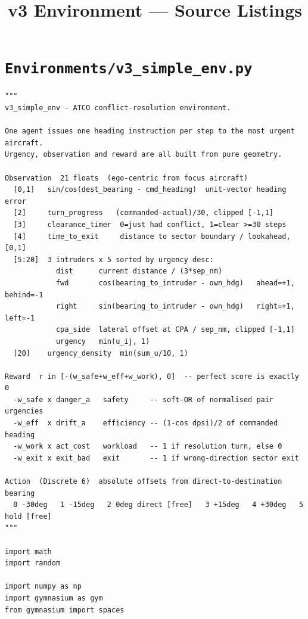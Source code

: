 \documentclass[10pt, a4paper]{article}
\title{\textbf{v3 Environment --- Source Listings}}
\author{}
\date{}
\begin{document}
\maketitle
\tableofcontents
\newpage

\section{\texttt{Environments/v3\_simple\_env.py}}

\begin{lstlisting}[caption={v3\_simple\_env.py --- ATCO conflict-resolution environment}, label=lst:env]
"""
v3_simple_env - ATCO conflict-resolution environment.

One agent issues one heading instruction per step to the most urgent aircraft.
Urgency, observation and reward are all built from pure geometry.

Observation  21 floats  (ego-centric from focus aircraft)
  [0,1]   sin/cos(dest_bearing - cmd_heading)  unit-vector heading error
  [2]     turn_progress   (commanded-actual)/30, clipped [-1,1]
  [3]     clearance_timer  0=just had conflict, 1=clear >=30 steps
  [4]     time_to_exit     distance to sector boundary / lookahead, [0,1]
  [5:20]  3 intruders x 5 sorted by urgency desc:
            dist      current distance / (3*sep_nm)
            fwd       cos(bearing_to_intruder - own_hdg)   ahead=+1, behind=-1
            right     sin(bearing_to_intruder - own_hdg)   right=+1, left=-1
            cpa_side  lateral offset at CPA / sep_nm, clipped [-1,1]
            urgency   min(u_ij, 1)
  [20]    urgency_density  min(sum_u/10, 1)

Reward  r in [-(w_safe+w_eff+w_work), 0]  -- perfect score is exactly 0
  -w_safe x danger_a   safety     -- soft-OR of normalised pair urgencies
  -w_eff  x drift_a    efficiency -- (1-cos dpsi)/2 of commanded heading
  -w_work x act_cost   workload   -- 1 if resolution turn, else 0
  -w_exit x exit_bad   exit       -- 1 if wrong-direction sector exit

Action  (Discrete 6)  absolute offsets from direct-to-destination bearing
  0 -30deg   1 -15deg   2 0deg direct [free]   3 +15deg   4 +30deg   5 hold [free]
"""

import math
import random

import numpy as np
import gymnasium as gym
from gymnasium import spaces


\end{lstlisting}
\end{document}

